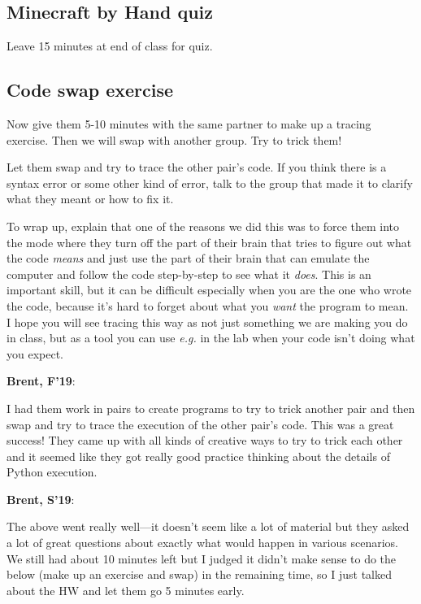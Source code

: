\documentclass{article}
\newcommand{\eg}{\emph{e.g.}\xspace}
\newenvironment{reflect}[1]
{
  \noindent
  \begin{lrbox}{\reflectbox}
    \begin{minipage}[t]{\textwidth}
      \textbf{#1}:
}{
    \end{minipage}
  \end{lrbox}
  \fbox{\usebox{\reflectbox}}
}
\begin{document}
\subsection*{Minecraft by Hand quiz}

Leave 15 minutes at end of class for quiz.

\subsection*{Code swap exercise}

Now give them 5-10 minutes with the same partner to make up a tracing
exercise.  Then we will swap with another group.  Try to trick them!

Let them swap and try to trace the other pair's code.  If you think
there is a syntax error or some other kind of error, talk to the group
that made it to clarify what they meant or how to fix it.

To wrap up, explain that one of the reasons we did this was to force
them into the mode where they turn off the part of their brain that
tries to figure out what the code \emph{means} and just use the part
of their brain that can emulate the computer and follow the code
step-by-step to see what it \emph{does}.  This is an important skill,
but it can be difficult especially when you are the one who wrote the
code, because it's hard to forget about what you \emph{want} the
program to mean.  I hope you will see tracing this way as not just
something we are making you do in class, but as a tool you can use \eg
in the lab when your code isn't doing what you expect.

\begin{reflect}{Brent, F'19}
  I had them work in pairs to create programs to try to trick another
  pair and then swap and try to trace the execution of the other
  pair's code.  This was a great success!  They came up with all kinds
  of creative ways to try to trick each other and it seemed like they
  got really good practice thinking about the details of Python
  execution.
\end{reflect}
\begin{reflect}{Brent, S'19}
  The above went really well---it doesn't seem like a lot of material
  but they asked a lot of great questions about exactly what would
  happen in various scenarios.  We still had about 10 minutes left but
  I judged it didn't make sense to do the below (make up an exercise
  and swap) in the remaining time, so I just talked about the HW and
  let them go 5 minutes early.
\end{reflect}
\end{document}
